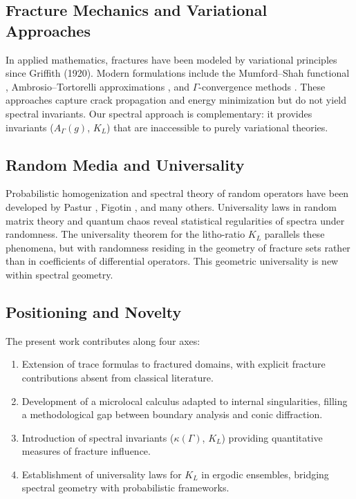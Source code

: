 \subsection{Fracture Mechanics and Variational Approaches}

In applied mathematics, fractures have been modeled by variational principles
since Griffith (1920). Modern formulations include the Mumford--Shah functional
\cite{MumfordShah1989}, Ambrosio--Tortorelli approximations
\cite{Ambrosio1990}, and $\Gamma$-convergence methods
\cite{FrancfortMarigo1998}. These approaches capture crack propagation and
energy minimization but do not yield spectral invariants. Our spectral
approach is complementary: it provides invariants ($A_\Gamma(g)$, $K_L$) that
are inaccessible to purely variational theories.

\subsection{Random Media and Universality}

Probabilistic homogenization and spectral theory of random operators have been
developed by Pastur \cite{Pastur1971}, Figotin \cite{Figotin1996}, and many
others. Universality laws in random matrix theory \cite{Mehta2004} and quantum
chaos \cite{Zelditch2017} reveal statistical regularities of spectra under
randomness. The universality theorem for the litho-ratio $K_L$ parallels these
phenomena, but with randomness residing in the geometry of fracture sets rather
than in coefficients of differential operators. This geometric universality is
new within spectral geometry.

\subsection{Positioning and Novelty}

The present work contributes along four axes:

\begin{enumerate}
  \item Extension of trace formulas to fractured domains, with explicit fracture
  contributions absent from classical literature.
  \item Development of a microlocal calculus adapted to internal singularities,
  filling a methodological gap between boundary analysis and conic diffraction.
  \item Introduction of spectral invariants ($\kappa(\Gamma)$, $K_L$) providing
  quantitative measures of fracture influence.
  \item Establishment of universality laws for $K_L$ in ergodic ensembles,
  bridging spectral geometry with probabilistic frameworks.
\end{enumerate}

